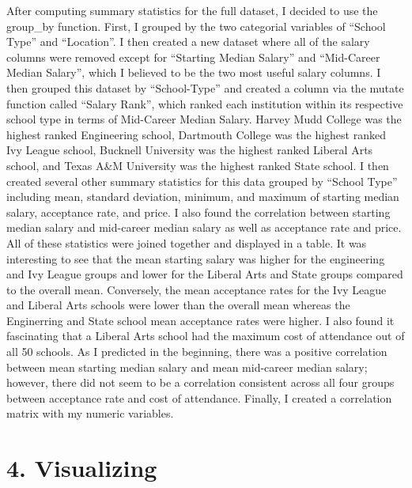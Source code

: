 \documentclass[]{article}
\begin{document}
After computing summary statistics for the full dataset, I decided to
use the group\_by function. First, I grouped by the two categorial
variables of ``School Type'' and ``Location''. I then created a new
dataset where all of the salary columns were removed except for
``Starting Median Salary'' and ``Mid-Career Median Salary'', which I
believed to be the two most useful salary columns. I then grouped this
dataset by ``School-Type'' and created a column via the mutate function
called ``Salary Rank'', which ranked each institution within its
respective school type in terms of Mid-Career Median Salary. Harvey Mudd
College was the highest ranked Engineering school, Dartmouth College was
the highest ranked Ivy League school, Bucknell University was the
highest ranked Liberal Arts school, and Texas A\&M University was the
highest ranked State school. I then created several other summary
statistics for this data grouped by ``School Type'' including mean,
standard deviation, minimum, and maximum of starting median salary,
acceptance rate, and price. I also found the correlation between
starting median salary and mid-career median salary as well as
acceptance rate and price. All of these statistics were joined together
and displayed in a table. It was interesting to see that the mean
starting salary was higher for the engineering and Ivy League groups and
lower for the Liberal Arts and State groups compared to the overall
mean. Conversely, the mean acceptance rates for the Ivy League and
Liberal Arts schools were lower than the overall mean whereas the
Enginerring and State school mean acceptance rates were higher. I also
found it fascinating that a Liberal Arts school had the maximum cost of
attendance out of all 50 schools. As I predicted in the beginning, there
was a positive correlation between mean starting median salary and mean
mid-career median salary; however, there did not seem to be a
correlation consistent across all four groups between acceptance rate
and cost of attendance. Finally, I created a correlation matrix with my
numeric variables.

\section{4. Visualizing}\label{visualizing}
\end{document}
